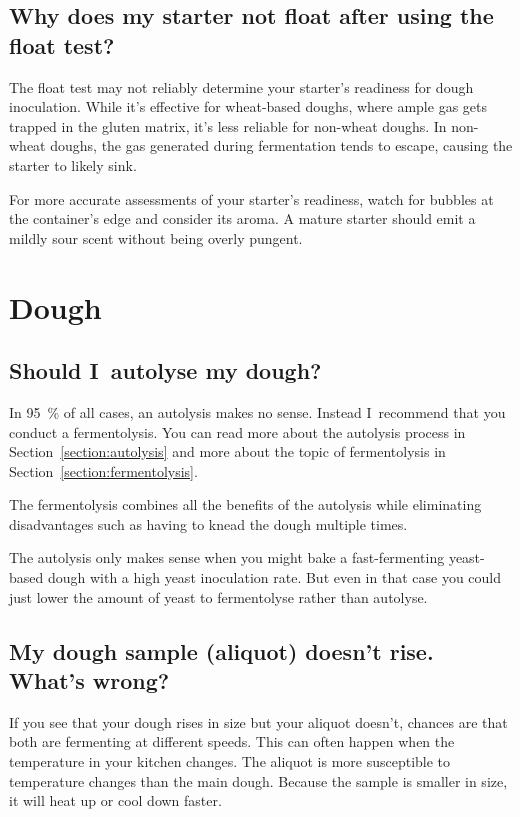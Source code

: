 \subsection{Why does my starter not float after using the float test?}
The float test may not reliably determine your starter's readiness for dough
inoculation. While it's effective for wheat-based doughs, where ample gas gets
trapped in the gluten matrix, it's less reliable for non-wheat doughs. In non-
wheat doughs, the gas generated during fermentation tends to escape, causing
the starter to likely sink.

For more accurate assessments of your starter's readiness, watch for bubbles
at the container's edge and consider its aroma. A mature starter should emit a
mildly sour scent without being overly pungent.

\section{Dough}
\subsection{Should I~autolyse my dough?}

In \qty{95}{\percent} of all cases, an autolysis
makes no sense. Instead I~recommend
that you conduct a fermentolysis. You
can read more about the autolysis process in
Section~\ref{section:autolysis} and
more about the topic of fermentolysis
in Section~\ref{section:fermentolysis}.

The fermentolysis combines all the benefits
of the autolysis while eliminating disadvantages
such as having to knead the dough multiple times.

The autolysis only makes sense when you might
bake a fast-fermenting yeast-based dough with a
high yeast inoculation rate. But even in that
case you could just lower the amount of yeast
to fermentolyse rather than autolyse.

\subsection{My dough sample (aliquot) doesn't rise. What's wrong?}

If you see that your dough rises in size but your aliquot doesn't, chances
are that both are fermenting at different speeds. This can often
happen when the temperature in your kitchen changes. The aliquot
is more susceptible to temperature changes than the main dough.
Because the sample is smaller in size, it will heat up or cool down
faster.

